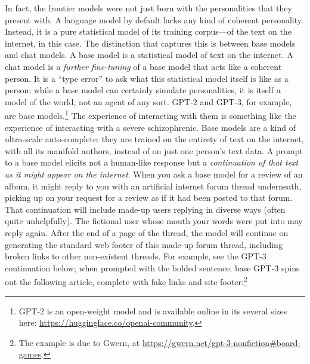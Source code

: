 In fact, the frontier models were not just born with the personalities that
they present with. A language model by default lacks any kind of coherent
personality. Instead, it is a pure statistical model of its training
corpus---of the text on the internet, in this case. The distinction that
captures this is between base models and chat models. A base model is a
statistical model of text on the internet. A chat model is a \emph{further
fine-tuning} of a base model that acts like a coherent person. It is a ``type
error'' to ask what this statistical model itself is like as a person; while a
base model can certainly simulate personalities, it is itself a model of the
world, not an agent of any sort. GPT-2 and GPT-3, for example, are base
models.\footnote{GPT-2 is an open-weight model and is available online in its
several sizes here: \url{https://huggingface.co/openai-community}.} The
experience of interacting with them is something like the experience of
interacting with a severe schizophrenic. Base models are a kind of ultra-scale
auto-complete: they are trained on the entirety of text on the internet, with
all its manifold authors, instead of on just one person's text data. A prompt
to a base model elicits not a human-like response but a \emph{continuation of
that text as it might appear on the internet}. When you ask a base model for a
review of an album, it might reply to you with an artificial internet forum
thread underneath, picking up on your request for a review as if it had been
posted to that forum. That continuation will include made-up users replying in
diverse ways (often quite unhelpfully). The fictional user whose mouth your
words were put into may reply again. After the end of a page of the thread, the
model will continue on generating the standard web footer of this made-up forum
thread, including broken links to other non-existent threads. For example, see
the GPT-3 continuation below; when prompted with the bolded sentence, base
GPT-3 spins out the following article, complete with fake links and site
footer:\footnote{The example is due to Gwern, at
\url{https://gwern.net/gpt-3-nonfiction\#board-games}.}

